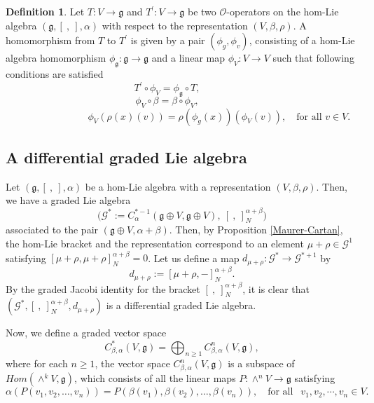 \documentclass[a4paper,11pt]{amsart}
\theoremstyle{plain}
\theoremstyle{definition}
\newtheorem{definition}[theorem]{Definition}
\theoremstyle{remark}
\numberwithin{equation}{section}
\begin{document}
\begin{definition}\label{morphism of O-operators}
Let $T:V\rightarrow \mathfrak{g}$ and $T^{\prime}:V\rightarrow \mathfrak{g}$ be two $\mathcal{O}$-operators on the hom-Lie algebra $(\mathfrak{g},[~,~],\alpha)$ with respect to the representation $(V,\beta,\rho)$. A homomorphism from $T$ to $T^{\prime}$ is given by a pair $(\phi_g,\phi_v)$, consisting of a hom-Lie algebra homomorphism $\phi_{\mathfrak{g}}:\mathfrak{g}\rightarrow \mathfrak{g}$ and a linear map $\phi_V: V\rightarrow V$ such that following conditions are satisfied
\begin{equation}\label{morphism:cond1}
T^{\prime}\circ \phi_V =\phi_{\mathfrak{g}}\circ T,\quad\quad\quad
\end{equation}
\begin{equation}\label{morphism:cond2}
\phi_V\circ \beta  =\beta\circ \phi_V,\quad\quad\quad
\end{equation}
\begin{equation}\label{morphism:cond3}
\quad\quad \quad\quad\quad\quad~~~~~~~\phi_V(\rho(x)(v)) =\rho(\phi_g(x))(\phi_V(v)), \quad\mbox{for all  }v\in V.
\end{equation}
\end{definition}

\subsection{A differential graded Lie algebra}

Let $(\mathfrak{g},[~,~],\alpha)$ be a hom-Lie algebra with a representation $(V,\beta,\rho)$. Then, we have a graded Lie algebra 
$$\textstyle{\big(\mathcal{G}^*:=C^{*-1}_{\alpha}(\mathfrak{g}\oplus V,\mathfrak{g}\oplus V),~[~,~]_N^{\alpha+\beta}\big)}$$ 
associated to the pair $(\mathfrak{g}\oplus V,\alpha+\beta)$.
 Then, by Proposition \ref{Maurer-Cartan}, the hom-Lie bracket and the representation correspond to an element $\mu+\rho\in \mathcal{G}^1$ satisfying $[\mu+\rho,\mu+\rho]_N^{\alpha+\beta}=0$. Let us define a map $d_{\mu+\rho}:\mathcal{G}^*\rightarrow \mathcal{G}^{*+1}$ by
$$d_{\mu+\rho}:=[\mu+\rho,-]_N^{\alpha+\beta}.$$
By the graded Jacobi identity for the bracket $[~,~]_N^{\alpha+\beta}$, it is clear that $(\mathcal{G}^*,[~,~]_N^{\alpha+\beta},d_{\mu+\rho})$ is a differential graded Lie algebra.

Now, we define a graded vector space 
\begin{equation*}
C^*_{\beta,\alpha}(V,\mathfrak{g})=\bigoplus_{n\geq 1}C^n_{\beta,\alpha}(V,\mathfrak{g}),
\end{equation*}
 where for each $n\geq 1$, the vector space $C^n_{\beta,\alpha}(V,\mathfrak{g})$ is a subspace of $Hom(\wedge^k V,\mathfrak{g})$, which consists of all the linear maps $P:\wedge^n V\rightarrow \mathfrak{g}$ satisfying 
$$\alpha(P(v_1,v_2,\ldots,v_{n}))=P(\beta(v_1),\beta(v_2),\ldots,\beta(v_{n})), \quad\mbox{for all }~~ v_1,v_2,\cdots, v_{n}\in V.$$
\end{document}
